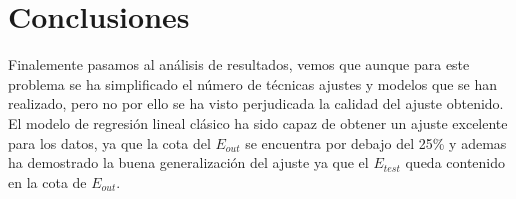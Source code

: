 \section{Conclusiones}
Finalemente pasamos al análisis de resultados, vemos que aunque para este problema se ha simplificado el número de técnicas ajustes y modelos que se han realizado, pero no por ello se ha visto perjudicada la calidad del ajuste obtenido.\\
El modelo de regresión lineal clásico ha sido capaz de obtener un ajuste excelente para los datos, ya que la cota del $E_{out}$ se encuentra por debajo del 25\% y ademas ha demostrado la buena generalización del ajuste ya que el $E_{test}$ queda contenido en la cota de $E_{out}$.
